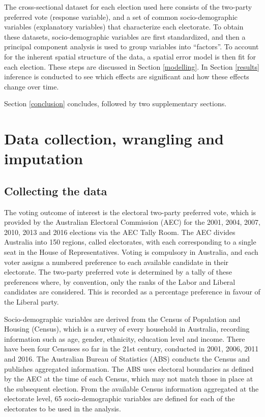 \documentclass[11pt,a4paper,]{article}
\begin{document}
The cross-sectional dataset for each election used here consists of the two-party preferred vote (response variable), and a set of common socio-demographic variables (explanatory variables) that characterize each electorate. To obtain these datasets, socio-demographic variables are first standardized, and then a principal component analysis is used to group variables into ``factors''. To account for the inherent spatial structure of the data, a spatial error model is then fit for each election. These steps are discussed in Section \ref{modelling}. In Section \ref{results} inference is conducted to see which effects are significant and how these effects change over time.

Section \ref{conclusion} concludes, followed by two supplementary sections.

\hypertarget{data}{%
\section{Data collection, wrangling and imputation}\label{data}}

\hypertarget{collecting-the-data}{%
\subsection{Collecting the data}\label{collecting-the-data}}

The voting outcome of interest is the electoral two-party preferred vote, which is provided by the Australian Electoral Commission (AEC) for the 2001, 2004, 2007, 2010, 2013 and 2016 elections via the AEC Tally Room. The AEC divides Australia into 150 regions, called electorates, with each corresponding to a single seat in the House of Representatives. Voting is compulsory in Australia, and each voter assigns a numbered preference to each available candidate in their electorate. The two-party preferred vote is determined by a tally of these preferences where, by convention, only the ranks of the Labor and Liberal candidates are considered. This is recorded as a percentage preference in favour of the Liberal party.

Socio-demographic variables are derived from the Census of Population and Housing (Census), which is a survey of every household in Australia, recording information such as age, gender, ethnicity, education level and income. There have been four Censuses so far in the 21st century, conducted in 2001, 2006, 2011 and 2016. The Australian Bureau of Statistics (ABS) conducts the Census and publishes aggregated information. The ABS uses electoral boundaries as defined by the AEC at the time of each Census, which may not match those in place at the subsequent election. From the available Census information aggregated at the electorate level, 65 socio-demographic variables are defined for each of the electorates to be used in the analysis.
\end{document}
